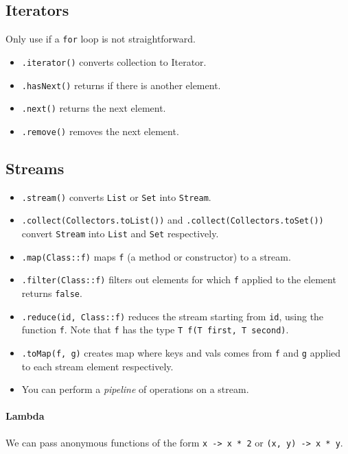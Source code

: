 \documentclass[twocolumn,english]{article}
\begin{document}
\subsection{Iterators}

Only use if a \texttt{for} loop is not straightforward.
\begin{itemize}
\item \texttt{.iterator()} converts collection to Iterator.
\item \texttt{.hasNext()} returns if there is another element.
\item \texttt{.next()} returns the next element.
\item \texttt{.remove()} removes the next element.
\end{itemize}

\subsection{Streams}
\begin{itemize}
\item \texttt{.stream()} converts \texttt{List} or \texttt{Set} into \texttt{Stream}.
\item \texttt{.collect(Collectors.toList())} and \texttt{.collect(Collectors.toSet())}
convert \texttt{Stream} into \texttt{List} and \texttt{Set} respectively.
\item \texttt{.map(Class::f)} maps \texttt{f} (a method or constructor)
to a stream.
\item \texttt{.filter(Class::f)} filters out elements for which \texttt{f}
applied to the element returns \texttt{false}.
\item \texttt{.reduce(id, Class::f)} reduces the stream starting from \texttt{id},
using the function \texttt{f}. Note that \texttt{f} has the type \texttt{T
f(T first, T second)}.
\item \texttt{.toMap(f, g)} creates map where keys and vals comes from \texttt{f}
and \texttt{g} applied to each stream element respectively.
\item You can perform a \emph{pipeline} of operations on a stream.
\end{itemize}

\paragraph{Lambda}

We can pass anonymous functions of the form \texttt{x -\textgreater{}
x {*} 2} or \texttt{(x, y) -\textgreater{} x {*} y}.
\end{document}
